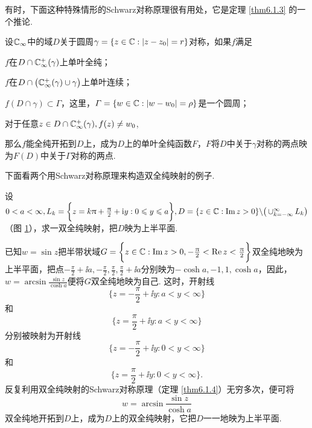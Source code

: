 有时，下面这种特殊情形的Schwarz对称原理很有用处，它是定理 \ref{thm6.1.3} 的一个推论.
\begin{theorem}\label{thm6.1.4}
设$\mathbb C_\infty$中的域$D$关于圆周$\gamma=\{z\in\mathbb C:|z-z_0|=r\}$对称，如果$f$满足
\begin{eenum}
  \item $f$在$D\cap\mathbb C_\infty^+(\gamma)$上单叶全纯；
  \item $f$在$D\cap\big(\mathbb C_\infty^+(\gamma)\cup\gamma\big)$上单叶连续；
  \item $f(D\cap\gamma)\subset\Gamma$，这里，$\varGamma=\{w\in\mathbb C:|w-w_0|=\rho\}$是一个圆周；
  \item 对于任意$z\in D\cap\mathbb C_\infty^+(\gamma),f(z)\ne w_0$,
\end{eenum}
那么$f$能全纯开拓到$D$上，成为$D$上的单叶全纯函数$F$，$F$将$D$中关于$\gamma$对称的两点映为$F(D)$中关于$\Gamma$对称的两点.
\end{theorem}

下面看两个用Schwarz对称原理来构造双全纯映射的例子.
\begin{example}\label{exam6.1.5}
设$0<a<\infty,L_k=\bigg\{z=k\uppi+\frac{\uppi}2+\textrm i y:0\leqslant y\leqslant a\bigg\},D=\{z\in\mathbb C:\operatorname{\textrm{Im}} z>0\}\backslash\big(\operatorname*{\cup}_{k=-\infty}^\infty L_k\big)$（图 \ref{fig6.2}），求一双全纯映射，把$D$映为上半平面.
\end{example}
\begin{figure}[!ht]
\centering
{}
\caption{\label{fig6.2}}
\end{figure}
\begin{solution}
已知$w=\sin z$把半带状域$G=\bigg\{z\in\mathbb C:\operatorname{\textrm{Im}} z>0,-\frac{\uppi}2<\operatorname{\textrm{Re}} z<\frac{\uppi}2\bigg\}$双全纯地映为上半平面，把点$-\frac\pi2+\ii a,-\frac\pi2,\frac\pi2,\frac\pi2+\ii a$分别映为$-\cosh a,-1,1,\cosh a$，因此，$w=\arcsin\frac{\sin z}{\cosh a}$便将$G$双全纯地映为自己. 这时，开射线
\[\bigg\{z=-\frac\pi2+\ii y:a<y<\infty\bigg\}\]
和
\[\bigg\{z=\frac\pi2+\ii y:a<y<\infty\bigg\}\]
分别被映射为开射线
\[\bigg\{z=-\frac\pi2+\ii y:0<y<\infty\bigg\}\]
和
\[\bigg\{z=\frac\pi2+\ii y:0<y<\infty\bigg\}.\]
反复利用双全纯映射的Schwarz对称原理（定理 \ref{thm6.1.4}）无穷多次，便可将
\[w=\arcsin\frac{\sin z}{\cosh a}\]
双全纯地开拓到$D$上，成为$D$上的双全纯映射，它把$D$一一地映为上半平面.
\end{solution}

